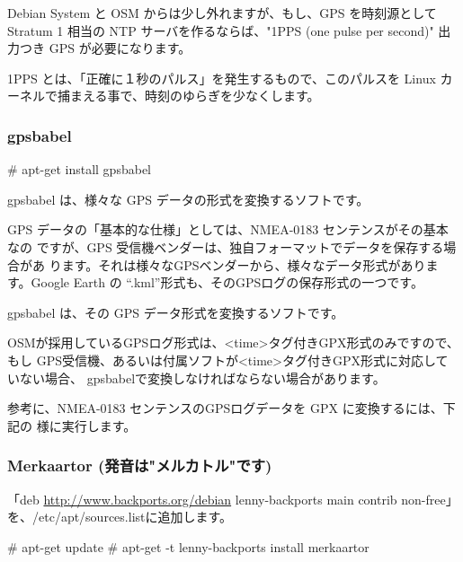 \documentclass[mingoth,a4paper]{jsarticle}
\begin{document}
Debian System と OSM からは少し外れますが、もし、GPS を時刻源として Stratum 1 相当の NTP サーバを作るならば、"1PPS (one pulse per second)" 出力つき GPS が必要になります。

1PPS とは、「正確に１秒のパルス」を発生するもので、このパルスを Linux カーネルで捕まえる事で、時刻のゆらぎを少なくします。

\subsubsection{gpsbabel}

\begin{commandline}
# apt-get install gpsbabel
\end{commandline}

gpsbabel は、様々な GPS データの形式を変換するソフトです。

GPS データの「基本的な仕様」としては、NMEA-0183 センテンスがその基本なの
ですが、GPS 受信機ベンダーは、独自フォーマットでデータを保存する場合があ
ります。それは様々なGPSベンダーから、様々なデータ形式があります。Google
Earth の “.kml”形式も、そのGPSログの保存形式の一つです。

gpsbabel は、その GPS データ形式を変換するソフトです。

OSMが採用しているGPSログ形式は、<time>タグ付きGPX形式のみですので、もし
GPS受信機、あるいは付属ソフトが<time>タグ付きGPX形式に対応していない場合、
gpsbabelで変換しなければならない場合があります。

参考に、NMEA-0183 センテンスのGPSログデータを GPX に変換するには、下記の
様に実行します。


\clearpage

\subsubsection{Merkaartor (発音は"メルカトル"です)}

「deb \url{http://www.backports.org/debian} lenny-backports main contrib non-free」を、/etc/apt/sources.listに追加します。

\begin{commandline}
# apt-get update
# apt-get -t lenny-backports install merkaartor
\end{commandline}
\end{document}
